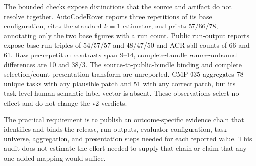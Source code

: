 The bounded checks expose distinctions that the source and artifact do not resolve together.
AutoCodeRover reports three repetitions of its base configuration, cites the standard $k=1$
estimator, and prints 57/66/78, annotating only the two base figures with a run count. Public run-output reports expose base-run triples of 54/57/57 and 48/47/50 and
ACR-sbfl counts of 66 and 61. Raw per-repetition contrasts span 9--14; complete-bundle
source-unbound differences are 10 and $38/3$. The source-to-public-bundle binding and complete
selection/count presentation transform are unreported. CMP-035 aggregates 78 unique tasks with
any plausible patch and 51 with any correct patch, but its task-level human semantic-label
vector is absent. These observations select no effect and do not change the v2 verdicts.

The practical requirement is to publish an outcome-specific evidence chain that identifies
and binds the release, run outputs, evaluator configuration, task universe, aggregation, and
presentation steps needed for each reported value. This audit does not estimate the effort
needed to supply that chain or claim that any one added mapping would suffice.
